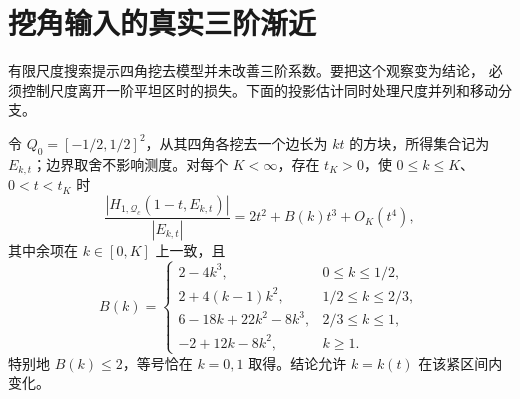 \section{挖角输入的真实三阶渐近}\label{cut:section}

有限尺度搜索提示四角挖去模型并未改善三阶系数。要把这个观察变为结论，
必须控制尺度离开一阶平坦区时的损失。下面的投影估计同时处理尺度并列和移动分支。

\begin{theorem}[紧挖角参数上的统一展开]\label{cut:main}
令 $Q_0=[-1/2,1/2]^2$，从其四角各挖去一个边长为 $kt$ 的方块，所得集合记为
$E_{k,t}$；边界取舍不影响测度。对每个 $K<\infty$，存在 $t_K>0$，使
$0\le k\le K$、$0<t<t_K$ 时
\begin{equation}\label{cut:expansion}
 \frac{|H_{1,\mathcal Q_c}(1-t,E_{k,t})|}{|E_{k,t}|}
 =2t^2+B(k)t^3+O_K(t^4),
\end{equation}
其中余项在 $k\in[0,K]$ 上一致，且
\[
 B(k)=\begin{cases}
 2-4k^3,&0\le k\le1/2,\\
 2+4(k-1)k^2,&1/2\le k\le2/3,\\
 6-18k+22k^2-8k^3,&2/3\le k\le1,\\
 -2+12k-8k^2,&k\ge1.
 \end{cases}
\]
特别地 $B(k)\le2$，等号恰在 $k=0,1$ 取得。结论允许 $k=k(t)$ 在该紧区间内变化。
\end{theorem}

